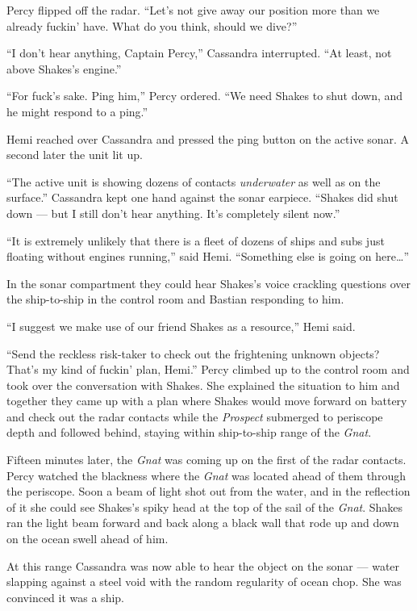 \documentclass[
]{scrbook}
\begin{document}
Percy flipped off the radar. ``Let's not give away our position more
than we already fuckin' have. What do you think, should we dive?''

``I don't hear anything, Captain Percy,'' Cassandra interrupted. ``At
least, not above Shakes's engine.''

``For fuck's sake. Ping him,'' Percy ordered. ``We need Shakes to shut
down, and he might respond to a ping.''

Hemi reached over Cassandra and pressed the ping button on the active
sonar. A second later the unit lit up.

``The active unit is showing dozens of contacts \emph{underwater} as
well as on the surface.'' Cassandra kept one hand against the sonar
earpiece. ``Shakes did shut down --- but I still don't hear anything.
It's completely silent now.''

``It is extremely unlikely that there is a fleet of dozens of ships and
subs just floating without engines running,'' said Hemi. ``Something
else is going on here\ldots{}''

In the sonar compartment they could hear Shakes's voice crackling
questions over the ship-to-ship in the control room and Bastian
responding to him.

``I suggest we make use of our friend Shakes as a resource,'' Hemi said.

``Send the reckless risk-taker to check out the frightening unknown
objects? That's my kind of fuckin' plan, Hemi.'' Percy climbed up to the
control room and took over the conversation with Shakes. She explained
the situation to him and together they came up with a plan where Shakes
would move forward on battery and check out the radar contacts while the
\emph{Prospect} submerged to periscope depth and followed behind,
staying within ship-to-ship range of the \emph{Gnat}.

Fifteen minutes later, the \emph{Gnat} was coming up on the first of the
radar contacts. Percy watched the blackness where the \emph{Gnat} was
located ahead of them through the periscope. Soon a beam of light shot
out from the water, and in the reflection of it she could see Shakes's
spiky head at the top of the sail of the \emph{Gnat}. Shakes ran the
light beam forward and back along a black wall that rode up and down on
the ocean swell ahead of him.

At this range Cassandra was now able to hear the object on the sonar ---
water slapping against a steel void with the random regularity of ocean
chop. She was convinced it was a ship.
\end{document}
